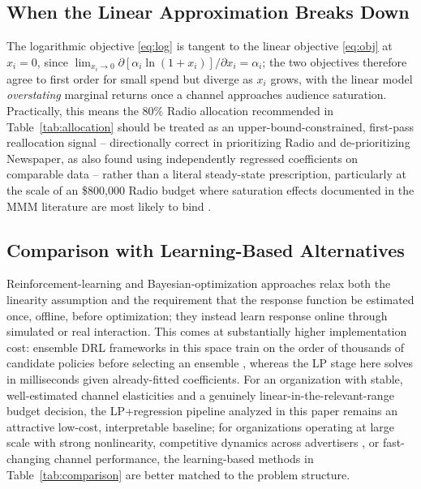 \documentclass[conference]{IEEEtran}
\begin{document}
\subsection{When the Linear Approximation Breaks Down}
The logarithmic objective \eqref{eq:log} is tangent to the linear objective \eqref{eq:obj} at $x_i=0$, since $\lim_{x_i\to 0}\partial[\alpha_i\ln(1+x_i)]/\partial x_i = \alpha_i$; the two objectives therefore agree to first order for small spend but diverge as $x_i$ grows, with the linear model \emph{overstating} marginal returns once a channel approaches audience saturation. Practically, this means the 80\% Radio allocation recommended in Table~\ref{tab:allocation} should be treated as an upper-bound-constrained, first-pass reallocation signal -- directionally correct in prioritizing Radio and de-prioritizing Newspaper, as also found using independently regressed coefficients on comparable data \cite{krasi_github} -- rather than a literal steady-state prescription, particularly at the scale of an \$800,000 Radio budget where saturation effects documented in the MMM literature are most likely to bind \cite{mmm_adstock,mmm_hill_pymc}.

\subsection{Comparison with Learning-Based Alternatives}
Reinforcement-learning and Bayesian-optimization approaches \cite{bora_2022,danaei_2026,li_ieee_access_2024} relax both the linearity assumption and the requirement that the response function be estimated once, offline, before optimization; they instead learn response online through simulated or real interaction. This comes at substantially higher implementation cost: ensemble DRL frameworks in this space train on the order of thousands of candidate policies before selecting an ensemble \cite{danaei_2026}, whereas the LP stage here solves in milliseconds given already-fitted coefficients. For an organization with stable, well-estimated channel elasticities and a genuinely linear-in-the-relevant-range budget decision, the LP+regression pipeline analyzed in this paper remains an attractive low-cost, interpretable baseline; for organizations operating at large scale with strong nonlinearity, competitive dynamics across advertisers \cite{adcob_2023}, or fast-changing channel performance, the learning-based methods in Table~\ref{tab:comparison} are better matched to the problem structure.
\end{document}
